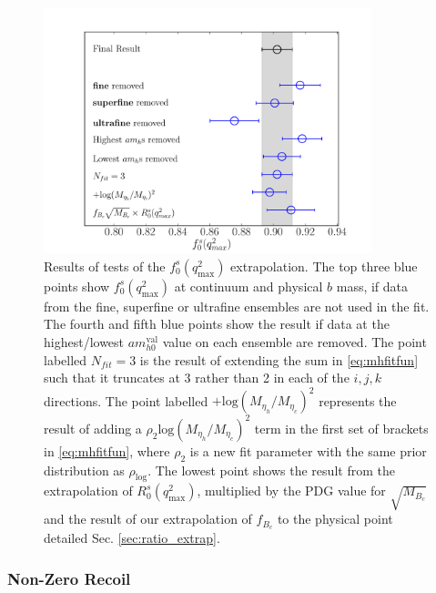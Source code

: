 \begin{figure}[ht]
  \begin{center}
  \hspace{-20pt}
  \includegraphics[width=0.85\textwidth]{images/BsDs/direct/f0q2max_stability.pdf}
  \caption{ Results of tests of the $f_0^s(q^2_{\text{max}})$ extrapolation. The top three blue points show $f_0^s(q^2_{\text{max}})$ at continuum and physical $b$ mass, if data from the fine, superfine or ultrafine ensembles are not used in the fit. The fourth and fifth blue points show the result if data at the highest/lowest $am_{h0}^{\text{val}}$ value on each ensemble are removed. The point labelled $N_{fit}=3$ is the result of extending the sum in \eqref{eq:mhfitfun} such that it truncates at 3 rather than 2 in each of the $i,j,k$ directions. The point labelled $+\text{log}(M_{\eta_h}/M_{\eta_c})^2$ represents the result of adding a $\rho_{2} \text{log}(M_{\eta_h}/M_{\eta_c})^2$ term in the first set of brackets in \eqref{eq:mhfitfun}, where $\rho_{2}$ is a new fit parameter with the same prior distribution as $\rho_{\text{log}}$. The lowest point shows the result from the extrapolation of $R_0^s(q^2_{\text{max}})$, multiplied by the PDG value for $\sqrt{M_{B_c}}$ \cite{PhysRevD.98.030001} and the result of our extrapolation of $f_{B_c}$ to the physical point detailed Sec. \ref{sec:ratio_extrap}.
    \label{fig:directtests}}
  \end{center}
\end{figure}

\subsubsection{Non-Zero Recoil}


